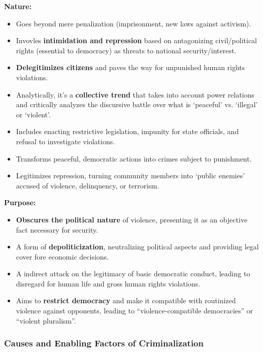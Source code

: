 \documentclass{article}
\begin{document}
    \noindent \textbf{Nature:}
    \begin{itemize}
        \item Goes beyond mere penalization (imprisonment, new laws against
        activism).
        \item Invovles \textbf{intimidation and repression} based on
        antagonizing civil/political rights (essential to democracy) as
        threats to national security/interest.
        \item \textbf{Delegitimizes citizens} and paves the way for
        unpunished human rights violations.
        \item Analytically, it's a \textbf{collective trend} that takes into
        account power relations and critically analyzes the discursive
        battle over what is `peaceful' vs. `illegal' or `violent'.
        \item Includes enacting restrictive legislation, impunity for state
        officials, and refusal to investigate violations.
        \item Transforms peaceful, democratic actions into crimes subject to
        punishment.
        \item Legitimizes repression, turning community members into `public
        enemies' accused of violence, delinquency, or terrorism.
    \end{itemize}

    \textbf{Purpose:}
    \begin{itemize}
        \item \textbf{Obscures the political nature} of violence, presenting
        it as an objective fact necessary for security.
        \item A form of \textbf{depoliticization}, neutralizing political
        aspects and providing legal cover fore economic decisions.
        \item A indirect attack on the legitimacy of basic democratic conduct,
        leading to disregard for human life and gross human rights violations.
        \item Aims to \textbf{restrict democracy} and make it compatible
        with routinized violence against opponents, leading to
        ``violence-compatible democracies'' or ``violent pluralism''.
    \end{itemize}

    \subsubsection{Causes and Enabling Factors of Criminalization}
\end{document}
